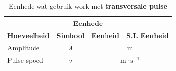 \begin{table}[H]
\begin{center}
\begin{tabular}{|l|c|c|c|}\hline \hline 
\multicolumn{4}{|c|}{\textbf{Eenhede}}\\ \hline \hline
\textbf{Hoeveelheid} & \textbf{Simbool} & \textbf{Eenheid} & \textbf{S.I. Eenheid}  \\ \hline
Amplitude & $A$ & \multicolumn{2}{c|}{m} \\ \hline
Pulse spoed & $v$ & \multicolumn{2}{c|}{$\text{m} \cdot \text{s}^{-1}$} \\ \hline
\end{tabular}
\end{center}
\caption{Eenhede wat gebruik work met \textbf{transversale pulse} }
\label{table:electricity::units}
\end{table}


